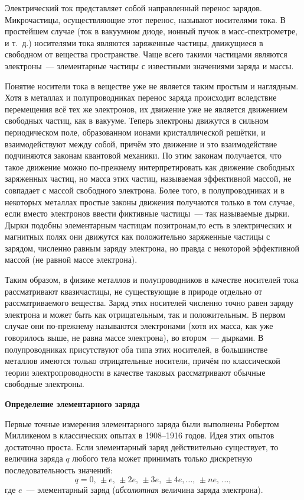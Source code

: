 
Электрический ток представляет собой направленный перенос зарядов. Микрочастицы, осуществляющие этот перенос, называют {\textsf{носителями тока}}. В простейшем случае (ток в вакуумном диоде, ионный пучок в масс-спектрометре, и т.~д.) носителями тока являются заряженные частицы, движущиеся в свободном от вещества пространстве. Чаще всего такими частицами являются электроны~--- элементарные частицы с известными значениями заряда и массы.

Понятие \textsf{носители тока в веществе} уже не является таким простым и наглядным. Хотя в металлах и полупроводниках перенос заряда происходит вследствие перемещения всё тех же электронов, их движение уже не является движением свободных частиц, как в вакууме. Теперь электроны движутся в сильном периодическом поле, образованном ионами кристаллической решётки, и взаимодействуют между собой, причём это движение и это взаимодействие подчиняются законам квантовой механики. По этим законам получается, что такое движение можно по-прежнему интерпретировать как движение свободных заряженных частиц, но масса этих частиц, называемая эффективной массой, не совпадает с массой свободного электрона. Более того, в полупроводниках и в некоторых металлах простые законы движения получаются только в том случае, если вместо электронов ввести фиктивные частицы~--- так называемые \textsf{дырки}. Дырки подобны элементарным частицам позитронам,то есть в электрических и магнитных полях они движутся как положительно заряженные частицы с зарядом, численно равным заряду электрона, но правда с некоторой эффективной массой (не равной массе электрона).

Таким образом, в физике металлов и полупроводников в качестве носителей тока рассматривают квазичастицы, не существующие в природе отдельно от рассматриваемого вещества. Заряд этих носителей численно точно равен заряду электрона и может быть как отрицательным, так и положительным. В первом случае они по-прежнему называются электронами (хотя их масса, как уже говорилось выше, не равна массе электрона), во втором~--- дырками. В полупроводниках присутствуют оба типа этих носителей, в большинстве металлов имеются только отрицательные носители, причём по классической теории электропроводности в качестве таковых рассматривают обычные свободные электроны.

{\bf \Large Определение элементарного заряда}

Первые точные измерения элементарного заряда были выполнены Робертом Милликеном в классических опытах в 1908--1916 годов. Идея этих опытов достаточно проста. Если элементарный заряд действительно существует, то величина заряда $q$ любого тела может принимать только дискретную последовательность значений:
$$q = 0,\,\pm e,\,\pm2e,\,\pm3e,\,\pm4e, \ldots,\, \pm ne,\, \ldots,
$$
где $e$~--- элементарный заряд (\emph{абсолютная} величина заряда электрона).

